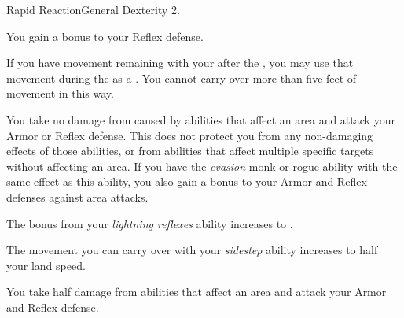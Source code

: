     \begin{feat}{Rapid Reaction}{General}
        \featpre Dexterity 2.

         You gain a  bonus to your Reflex defense.

         If you have movement remaining with your  after the , you may use that movement during the  as a .
        You cannot carry over more than five feet of movement in this way.

         You take no damage from  caused by abilities that affect an area and attack your Armor or Reflex defense.
        This does not protect you from any non-damaging effects of those abilities, or from abilities that affect multiple specific targets without affecting an area.
        If you have the \textit{evasion} monk or rogue ability with the same effect as this ability, you also gain a  bonus to your Armor and Reflex defenses against area attacks.

         The bonus from your \textit{lightning reflexes} ability increases to .

         The movement you can carry over with your \textit{sidestep} ability increases to half your land speed.

         You take half damage from abilities that affect an area and attack your Armor and Reflex defense.
    \end{feat}

